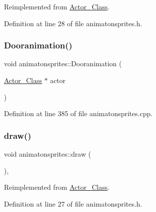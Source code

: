 Reimplemented from \hyperlink{class_actor___class_a9447c6154a674d7e6bdf24ff2874b7a8}{Actor\+\_\+\+Class}.



Definition at line 28 of file animatonsprites.\+h.

\hypertarget{classanimatonsprites_a94dceae0ec3b4efe4940c4e8208ce1e6}{}\label{classanimatonsprites_a94dceae0ec3b4efe4940c4e8208ce1e6} 
\subsubsection{\texorpdfstring{Dooranimation()}{Dooranimation()}}
{\footnotesize\ttfamily void animatonsprites\+::\+Dooranimation (\begin{DoxyParamCaption}\item[{\hyperlink{class_actor___class}{Actor\+\_\+\+Class} $\ast$}]{actor }\end{DoxyParamCaption})}



Definition at line 385 of file animatonsprites.\+cpp.

\hypertarget{classanimatonsprites_ac009e9d25649abc90551981421de9f72}{}\label{classanimatonsprites_ac009e9d25649abc90551981421de9f72} 
\subsubsection{\texorpdfstring{draw()}{draw()}}
{\footnotesize\ttfamily void animatonsprites\+::draw (\begin{DoxyParamCaption}{ }\end{DoxyParamCaption})\hspace{0.3cm}{\ttfamily [inline]}, {\ttfamily [virtual]}}



Reimplemented from \hyperlink{class_actor___class_ac49cd62be76b4b950ecbe155413f1b64}{Actor\+\_\+\+Class}.



Definition at line 27 of file animatonsprites.\+h.

\hypertarget{classanimatonsprites_abd2ff02cecde1c8fa445c9c61dadb7b2}{}\label{classanimatonsprites_abd2ff02cecde1c8fa445c9c61dadb7b2} 
